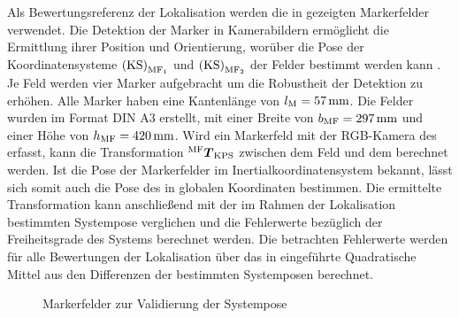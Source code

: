 Als Bewertungsreferenz der Lokalisation werden die in  gezeigten Markerfelder verwendet. Die Detektion der Marker in Kamerabildern ermöglicht die Ermittlung ihrer Position und Orientierung, worüber die Pose der Koordinatensysteme ${\mathrm{(KS)}}_{\mathrm{MF_1}}$ und ${\mathrm{(KS)}}_{\mathrm{MF_2}}$ der Felder bestimmt werden kann \cite{arsys}. Je Feld werden vier Marker aufgebracht um die Robustheit der Detektion zu erhöhen. Alle Marker haben eine Kantenlänge von $l_{\mathrm{M}} = \SI{57}{\milli\meter}$. Die Felder wurden im Format DIN A3 erstellt, mit einer Breite von $b_{\mathrm{MF}}=\SI{297}{\milli\meter}$ und einer Höhe von $h_{\mathrm{MF}}=\SI{420}{\milli\meter}$. Wird ein Markerfeld mit der RGB-Kamera des  erfasst, kann die Transformation ${^{\mathrm{MF}}\mbox{\boldmath{$T$}}_{\mathrm{KPS}}}$ zwischen dem Feld und dem \kps{} berechnet werden. Ist die Pose der Markerfelder im Inertialkoordinatensystem bekannt, lässt sich somit auch die Pose des  in globalen Koordinaten bestimmen. Die ermittelte Transformation kann anschließend mit der im Rahmen der Lokalisation bestimmten Systempose verglichen und die Fehlerwerte bezüglich der Freiheitsgrade des Systems berechnet werden. Die betrachten Fehlerwerte werden für alle Bewertungen der Lokalisation über das in  eingeführte Quadratische Mittel aus den Differenzen der bestimmten Systemposen berechnet.

\begin{figure}[!ht]
	\begin{center}
	\hspace{-10mm}
	\hspace{-23mm}
	\caption{Markerfelder zur Validierung der Systempose}
	\label{fig.armarker}
	\end{center}
	\vspace*{-2mm}
\end{figure}


%


